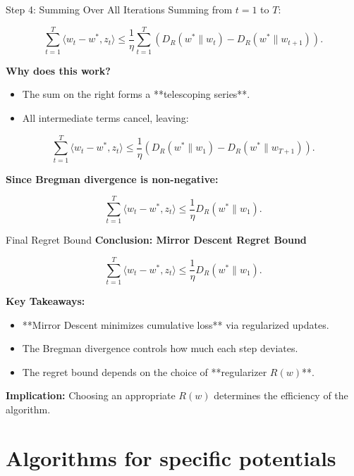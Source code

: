 \documentclass[handout]{beamer}
\begin{document}
\begin{small}
\begin{frame}{Step 4: Summing Over All Iterations}
Summing from \( t = 1 \) to \( T \):

\[
\sum_{t=1}^{T} \langle w_t - w^*, z_t \rangle \leq \frac{1}{\eta} \sum_{t=1}^{T} \left(D_R(w^* \| w_t) - D_R(w^* \| w_{t+1}) \right).
\]

\textbf{Why does this work?}
\begin{itemize}
    \item The sum on the right forms a **telescoping series**.
    \item All intermediate terms cancel, leaving:
\end{itemize}

\[
\sum_{t=1}^{T} \langle w_t - w^*, z_t \rangle \leq \frac{1}{\eta} (D_R(w^* \| w_1) - D_R(w^* \| w_{T+1})).
\]

\textbf{Since Bregman divergence is non-negative:}

\[
\sum_{t=1}^{T} \langle w_t - w^*, z_t \rangle \leq \frac{1}{\eta} D_R(w^* \| w_1).
\]
\end{frame}

\begin{frame}{Final Regret Bound}
\textbf{Conclusion: Mirror Descent Regret Bound}

\[
\sum_{t=1}^{T} \langle w_t - w^*, z_t \rangle \leq \frac{1}{\eta} D_R(w^* \| w_1).
\]

\textbf{Key Takeaways:}
\begin{itemize}
    \item **Mirror Descent minimizes cumulative loss** via \textcolor{mathcolor}{regularized updates}.
    \item The \textcolor{mathcolor}{Bregman divergence} controls how much each step deviates.
    \item The regret bound depends on the choice of **regularizer \( R(w) \)**.
\end{itemize}

\textbf{Implication:} Choosing an appropriate \( R(w) \) determines the efficiency of the algorithm.
\end{frame}

\section{Algorithms for specific potentials}


\end{small}
\end{document}

